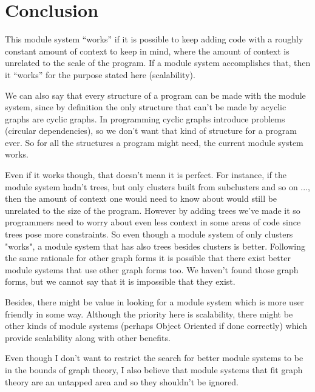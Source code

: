 \documentclass{article}
\begin{document}

\section{Conclusion}

This module system “works” if it is possible to keep adding code with a roughly constant amount of context to keep in mind, where the amount of context is unrelated to the scale of the program. If a module system accomplishes that, then it “works” for the purpose stated here (scalability). 

We can also say that every structure of a program can be made with the module system, since by definition the only structure that can't be made by acyclic graphs are cyclic graphs. In programming cyclic graphs introduce problems (circular dependencies), so we don't want that kind of structure for a program ever. So for all the structures a program might need, the current module system works.

Even if it works though, that doesn't mean it is perfect. For instance, if the module system hadn't trees, but only clusters built from subclusters and so on ..., then the amount of context one would need to know about would still be unrelated to the size of the program. However by adding trees we've made it so programmers need to worry about even less context in some areas of code since trees pose more constraints. So even though a module system of only clusters "works", a module system that has also trees besides clusters is better. Following the same rationale for other graph forms it is possible that there exist better module systems that use other graph forms too. We haven't found those graph forms, but we cannot say that it is impossible that they exist.

Besides, there might be value in looking for a module system which is more user friendly in some way. Although the priority here is scalability, there might be other kinds of module systems (perhaps Object Oriented if done correctly) which provide scalability along with other benefits.

Even though I don’t want to restrict the search for better module systems to be in the bounds of graph theory, I also believe that module systems that fit graph theory are an untapped area and so they shouldn’t be ignored.
\end{document}
